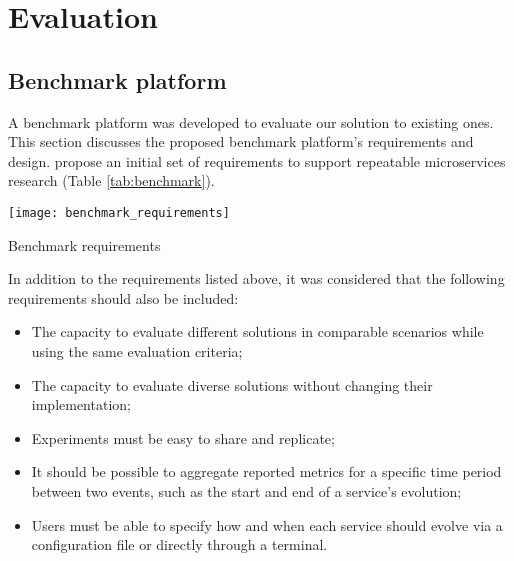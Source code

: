 
%

\chapter{Evaluation}
\label{cha:evaluation}

\section{Benchmark platform} %
\label{sec:benchmark_platform}

A benchmark platform was developed to evaluate our solution to existing ones.
This section discusses the proposed benchmark platform's requirements and design.
\citeauthor{microservices2017benchmark} \cite{microservices2017benchmark} propose an initial set of requirements
to support repeatable microservices research (Table \ref{tab:benchmark}).

\begin{table}[htb]
    \centering
    \texttt{[image: benchmark\_requirements]}
    \caption{Benchmark requirements \cite{microservices2017benchmark}}
    \label{tab:benchmark}
\end{table}

In addition to the requirements listed above, it was considered that the following requirements should also be included:
\begin{itemize}
    \setlength\itemsep{0em}
    \item The capacity to evaluate different solutions in comparable scenarios while using the same evaluation criteria;
    \item The capacity to evaluate diverse solutions without changing their implementation;
    \item Experiments must be easy to share and replicate;
    \item It should be possible to aggregate reported metrics for a specific time period between two events, such as the start and end of a service's evolution;
    \item Users must be able to specify how and when each service should evolve via a configuration file or directly through a terminal.
\end{itemize}

